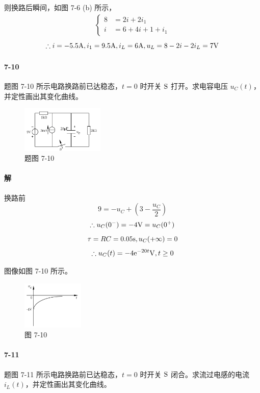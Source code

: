 \documentclass[hyperref, UTF8]{ctexart}
\newcommand{\volt}{{\rm V}}
\newcommand{\second}{{\rm s}}
\newcommand{\ampere}{{\rm A}}
\newcommand{\E}{{\rm e}}
\begin{document}
则换路后瞬间，如图 7-6 (b) 所示，
\begin{align*}
\left\{ \begin{aligned}
8 &= 2i + 2i_1 \\
i &= 6 + 4i + 1 + i_1
\end{aligned} \right.
\end{align*}
$$\therefore i = -5.5\ampere, i_1 = 9.5\ampere, i_L = 6\ampere, u_L = 8-2i-2i_L = 7\volt $$

\paragraph{7-10}\label{7-10}
题图 7-10 所示电路换路前已达稳态，$t=0$ 时开关 $\rm S$ 打开。求电容电压 $u_C(t)$，并定性画出其变化曲线。

\begin{figure}[!htb]
\centering
\includegraphics[width=0.351\textwidth]{p7-10.png}
\caption*{题图 7-10}
\end{figure}

\paragraph{解}
换路前
$$ 9 = -u_C + (3 - \frac{u_C}{2})$$
$$ \therefore u_C(0^-) = -4\volt = u_C(0^+) $$
$$ \tau = RC = 0.05 \second, u_C(+\infty) = 0 $$
$$ \therefore u_C(t) = -4 \E ^{-20t} \volt, t \ge 0 $$

图像如图 7-10 所示。

\begin{figure}[!htb]
\centering
\includegraphics[width=0.262\textwidth]{p7-10-sol.png}
\caption*{图 7-10}
\end{figure}

\paragraph{7-11}\label{7-11}
题图 7-11 所示电路换路前已达稳态，$t=0$ 时开关 $\rm S$ 闭合。求流过电感的电流 $i_L(t)$，并定性画出其变化曲线。
\end{document}
